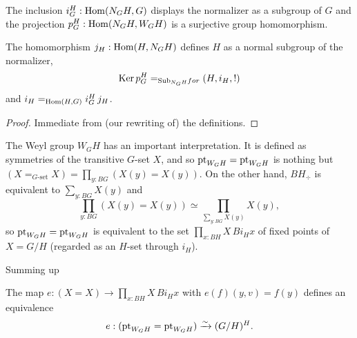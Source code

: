 

\begin{lemma}
  The inclusion $i_G^H:\Hom(N_GH,G)$ displays the normalizer as a subgroup of $G$ and the projection $p_G^H:\Hom(N_GH,W_GH)$ is a surjective group homomorphism.  

The homomorphism $j_H:\Hom(H,N_GH)$ defines $H$ as a normal subgroup of the normalizer,
$$\ker p_G^H=_{\typesubgroup_{N_GH}for}(H,i_H,!)$$
and $i_H=_{\Hom(H,G)}i_G^H\,j_H$.
\end{lemma}
\begin{proof}
  Immediate from (our rewriting of) the definitions.
\end{proof}

The Weyl group $W_GH$ has an important interpretation.  It is defined as symmetries of the transitive $G$-set $X$, and so $\mathrm{pt}_{W_GH}=\mathrm{pt}_{W_GH}$ is nothing but $(X=_{G\text{-set}}X)=\prod_{y:BG}(X(y)=X(y))$.  On the other hand, $BH_\div$ is equivalent to $\sum_{y:BG}X(y)$ and 
$$\prod_{y:BG}(X(y)=X(y))\simeq \prod_{\sum_{y:BG}X(y)}X(y),$$ so $\mathrm{pt}_{W_GH}=\mathrm{pt}_{W_GH}$ is equivalent to the set $%
\prod_{x:BH}X\, Bi_Hx$ of fixed points of $X=G/H$ (regarded as an $H$-set through $i_H$).

Summing up
\begin{lemma}
  \label{lem:WGHisHfixofG/H}
  The map  $e:(X=X)\to \prod_{x:BH}X\, Bi_Hx$ with $e(f)(y,v)=f(y)$ defines an equivalence
$$e:(\mathrm{pt}_{W_GH}=\mathrm{pt}_{W_GH})\xrightarrow{\sim} (G/H)^H.$$ 
\end{lemma}

